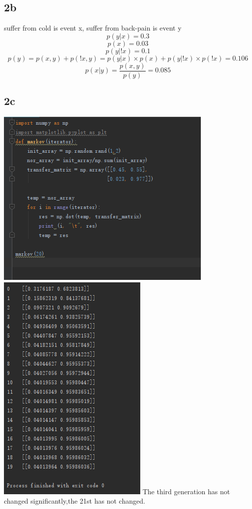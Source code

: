 \documentclass{article}
\begin{document}
\subsection{2b}
suffer from cold is event x, suffer from back-pain is event y
$$p(y|x)=0.3$$
$$p(x)=0.03$$
$$p(y|!x)=0.1$$
$$p(y)=p(x,y)+p(!x,y)=p(y|x)\times p(x)+p(y|!x)\times p(!x)=0.106$$
$$p(x|y)=\frac{p(x,y)}{p(y)}=0.085$$
\subsection{2c}
\includegraphics[scale=0.6]{1590578111(1).png}
\includegraphics[scale=0.6]{1590578087(1).png}
The third generation has not changed significantly,the 21st has not changed.
\end{document}
